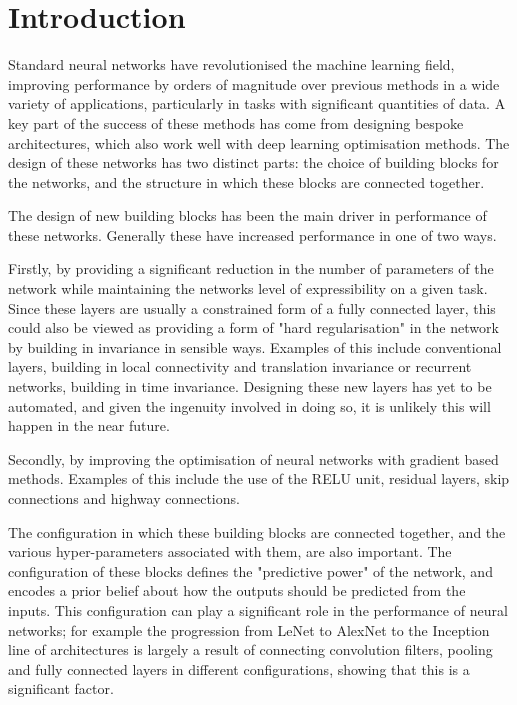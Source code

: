 
\chapter{Introduction}  %

\ifpdf
    \graphicspath{{Chapter1/Figs/Raster/}{Chapter1/Figs/PDF/}{Chapter1/Figs/}}
\else
    \graphicspath{{Chapter1/Figs/Vector/}{Chapter1/Figs/}}
\fi

Standard neural networks have revolutionised the machine learning field, improving performance by orders of magnitude over previous methods in a wide variety of applications, particularly in tasks with significant quantities of data. A key part of the success of these methods has come from designing bespoke architectures, which also work well with deep learning optimisation methods. The design of these networks has two distinct parts: the choice of building blocks for the networks, and the structure in which these blocks are connected together.

The design of new building blocks has been the main driver in performance of these networks. Generally these have increased performance in one of two ways. 

Firstly, by providing a significant reduction in the number of parameters of the network while maintaining the networks level of expressibility on a given task. Since these layers are usually a constrained form of a fully connected layer, this could also be viewed as providing a form of "hard regularisation" in the network by building in invariance in sensible ways. Examples of this include conventional layers, building in local connectivity and translation invariance or recurrent networks, building in time invariance. Designing these new layers has yet to be automated, and given the ingenuity involved in doing so, it is unlikely this will happen in the near future. 

Secondly, by improving the optimisation of neural networks with gradient based methods. Examples of this include the use of the RELU unit, residual layers, skip connections and highway connections.

The configuration in which these building blocks are connected together, and the various hyper-parameters associated with them, are also important. The configuration of these blocks defines the "predictive power" of the network, and encodes a prior belief about how the outputs should be predicted from the inputs. This configuration can play a significant role in the performance of neural networks; for example the progression from LeNet \citep{LeCun1989} to AlexNet \citep{NIPS2012_4824} to the Inception line of architectures \citep{DBLP:journals/corr/SzegedyLJSRAEVR14,DBLP:journals/corr/SzegedyVISW15,DBLP:journals/corr/SzegedyIV16} is largely a result of connecting convolution filters, pooling and fully connected layers in different configurations, showing that this is a significant factor. 

